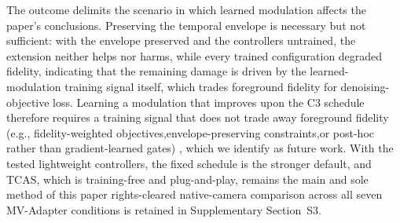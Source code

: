 \documentclass[times,twocolumn,final]{elsarticle}
\providecommand{\DIFadd}[1]{{\protect\color{blue} \sf #1}} %
\providecommand{\DIFdel}[1]{{\protect\color{red} \scriptsize #1}} %
\providecommand{\DIFaddbegin}{} %
\providecommand{\DIFaddend}{} %
\providecommand{\DIFdelbegin}{} %
\providecommand{\DIFdelend}{} %
\begin{document}
\DIFdel{The outcome delimits the scenario in which learned modulation affects the paper's conclusions. Preserving the temporal envelope is necessary but not sufficient: with the envelope preserved and the controllers untrained, the extension neither helps nor harms, while every trained configuration degraded fidelity, indicating that the remaining damage is driven by the learned-modulation training signal itself, which trades foreground fidelity for denoising-objective loss. Learning a modulation that improves upon the C3 schedule therefore requires a training signal that does not trade away foreground fidelity (e.g., fidelity-weighted objectives,envelope-preserving constraints,or post-hoc rather than gradient-learned gates) , which we identify as future work. With the tested lightweight controllers, the fixed schedule is the stronger default, and TCAS, which is training-free and plug-and-play, remains the main and sole method of this paper}\DIFdelend \DIFaddbegin \DIFadd{rights-cleared native-camera comparison across all seven MV-Adapter conditions is retained in Supplementary Section~S3}\DIFaddend .

\DIFdelbegin %

\end{document}
